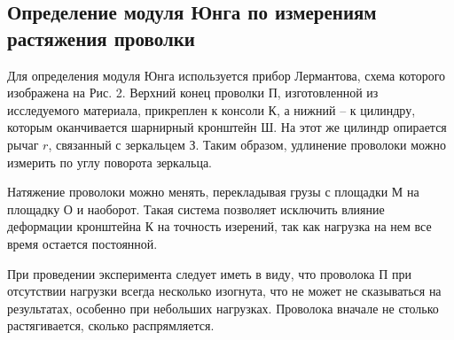 \documentclass[a4paper,12pt]{article} %
\begin{document}
\subsection{Определение модуля Юнга по измерениям растяжения проволки}
Для определения модуля Юнга используется прибор Лермантова, схема которого изображена на Рис. 2. Верхний конец проволки П, изготовленной из исследуемого материала, прикреплен к консоли К, а нижний -- к цилиндру, которым оканчивается шарнирный кронштейн Ш. На этот же цилиндр опирается рычаг $r$, связанный с зеркальцем З. Таким образом, удлинение проволоки можно измерить по углу поворота зеркальца.

Натяжение проволоки можно менять, перекладывая грузы с площадки М на площадку О и наоборот. Такая система позволяет исключить влияние деформации кронштейна К на точность изерений, так как нагрузка на нем все время остается постоянной.

При проведении эксперимента следует иметь в виду, что проволока П при отсутствии нагрузки всегда несколько изогнута, что не может не сказываться на результатах, особенно при небольших нагрузках. Проволока вначале не столько растягивается, сколько распрямляется.
\end{document}
